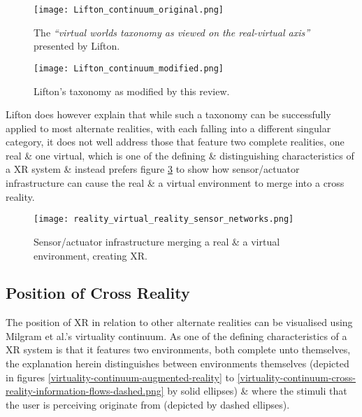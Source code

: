 \begin{figure}[h]
	\centering
	\texttt{[image: Lifton\_continuum\_original.png]}
	\caption{The \textit{``virtual worlds taxonomy as viewed on the real-virtual axis''} presented by Lifton.}
	\label{original_lifton_axis.png}
\end{figure}

\begin{figure}[h]
	\centering
	\texttt{[image: Lifton\_continuum\_modified.png]}
	\caption{Lifton's taxonomy as modified by this review.}
	\label{modified_lifton_axis.png}
\end{figure}

Lifton does however explain that while such a taxonomy can be successfully applied to most alternate realities, with each falling into a different singular category, it does not well address those that feature two complete realities, one real \& one virtual, which is one of the defining \& distinguishing characteristics of a XR system \& instead prefers figure \ref{reality_virtual_reality_sensor_networks.png} to show how sensor/actuator infrastructure can cause the real \& a virtual environment to merge into a cross reality.

\begin{figure}[h]
	\centering
	\texttt{[image: reality\_virtual\_reality\_sensor\_networks.png]}
	\caption{Sensor/actuator infrastructure merging a real \& a virtual environment, creating XR.}
	\label{reality_virtual_reality_sensor_networks.png}
\end{figure}



\subsection{Position of Cross Reality}

\label{positionofcrossreality}

\newcommand{\avxrfootnote}{\footnote{This discussion over the relationship between AR \& XR also stands for the relationship between AV \& XR, however as AV has received less attention in the literature \& in commercially available implementations, the discussion uses AR as its example.}}

The position of XR in relation to other alternate realities can be visualised using Milgram et al.'s virtuality continuum. As one of the defining characteristics of a XR system is that it features two environments, both complete unto themselves, the explanation herein distinguishes between environments themselves (depicted in figures \ref{virtuality-continuum-augmented-reality} to \ref{virtuality-continuum-cross-reality-information-flows-dashed.png} by solid ellipses) \& where the stimuli that the user is perceiving originate from (depicted by dashed ellipses).

